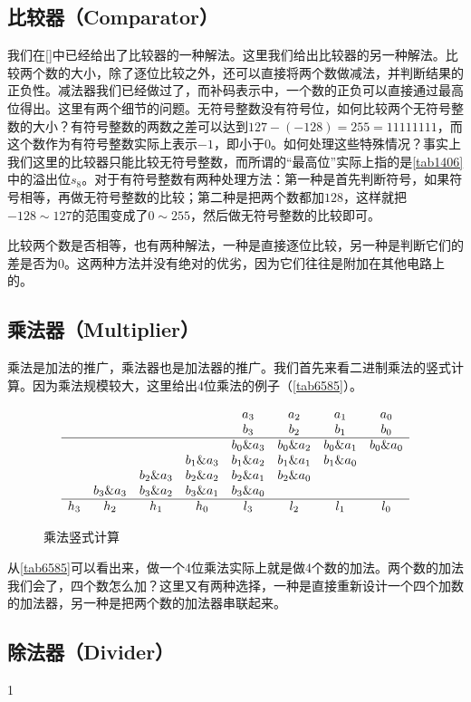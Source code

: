 \subsection{比较器（Comparator）}
我们在\autoref{}中已经给出了比较器的一种解法。这里我们给出比较器的另一种解法。比较两个数的大小，除了逐位比较之外，还可以直接将两个数做减法，并判断结果的正负性。减法器我们已经做过了，而补码表示中，一个数的正负可以直接通过最高位得出。这里有两个细节的问题。无符号整数没有符号位，如何比较两个无符号整数的大小？有符号整数的两数之差可以达到$127-(-128)=255=11111111$，而这个数作为有符号整数实际上表示$-1$，即小于0。如何处理这些特殊情况？事实上我们这里的比较器只能比较无符号整数，而所谓的“最高位”实际上指的是\autoref{tab1406}中的溢出位$s_8$。对于有符号整数有两种处理方法：第一种是首先判断符号，如果符号相等，再做无符号整数的比较；第二种是把两个数都加$128$，这样就把$-128\sim127$的范围变成了$0\sim255$，然后做无符号整数的比较即可。

比较两个数是否相等，也有两种解法，一种是直接逐位比较，另一种是判断它们的差是否为0。这两种方法并没有绝对的优劣，因为它们往往是附加在其他电路上的。

\subsection{乘法器（Multiplier）}
乘法是加法的推广，乘法器也是加法器的推广。我们首先来看二进制乘法的竖式计算。因为乘法规模较大，这里给出4位乘法的例子（\autoref{tab6585}）。

\begin{figure}[!h]
$$
\begin{array}{ccccccccc}
&&&&a_3&a_2&a_1&a_0\\
&&&&b_3&b_2&b_1&b_0\\\hline
&&&&b_0\&a_3&b_0\&a_2&b_0\&a_1&b_0\&a_0\\
&&&b_1\&a_3&b_1\&a_2&b_1\&a_1&b_1\&a_0\\
&&b_2\&a_3&b_2\&a_2&b_2\&a_1&b_2\&a_0\\
&b_3\&a_3&b_3\&a_2&b_3\&a_1&b_3\&a_0\\\hline
h_3&h_2&h_1&h_0&l_3&l_2&l_1&l_0
\end{array}
$$
\caption{乘法竖式计算}\label{tab6585}
\end{figure}

从\autoref{tab6585}可以看出来，做一个4位乘法实际上就是做4个数的加法。两个数的加法我们会了，四个数怎么加？这里又有两种选择，一种是直接重新设计一个四个加数的加法器，另一种是把两个数的加法器串联起来。

\subsection{除法器（Divider）}
1
